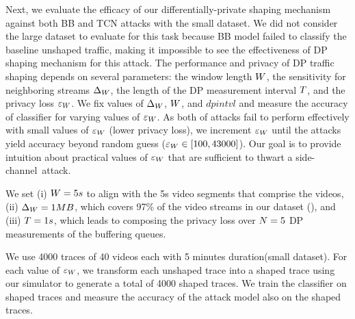 Next, we evaluate the efficacy of our differentially-private shaping mechanism against both BB and TCN attacks with the small dataset.
We did not consider the large dataset to evaluate for this task because BB model failed to classify the baseline unshaped traffic, making it impossible to see the effectiveness of DP shaping mechanism for this attack.
The performance and privacy of DP traffic shaping depends on several parameters: the window length $W$, the sensitivity for neighboring streams $\Delta_{W}$, the length of the DP measurement interval $T$, and the privacy loss $\varepsilon_{W}$.
We fix values of $\Delta_{W}$, $W$, and $dpintvl$ and measure the accuracy of classifier for varying values of $\varepsilon_{W}$.
As both of attacks fail to perform effectively with small values of $\varepsilon_{W}$ (\ie lower privacy loss), we increment $\varepsilon_{W}$ until the attacks yield accuracy beyond random guess (\ie $\varepsilon_{W} \in [100, 43000]$).
Our goal is to provide intuition about practical values of $\varepsilon_{W}$ that are sufficient to thwart a side-channel~attack.

We set (i) $W = 5s$ to align with the 5s video segments that comprise the videos, (ii) $\Delta_{W} = 1 MB$, which covers 97\% of the video streams in our dataset ({\addref}), and (iii) $T = 1s$, which leads to composing the privacy loss over $N = 5$ DP measurements of the buffering queues.

We use 4000 traces of 40 videos each with 5 minutes duration(\ie small dataset).
For each value of $\varepsilon_{W}$, we transform each unshaped trace into a shaped trace using our simulator to generate a total of 4000 shaped traces.
We train the classifier on shaped traces and measure the accuracy of the attack model also on the shaped traces.

